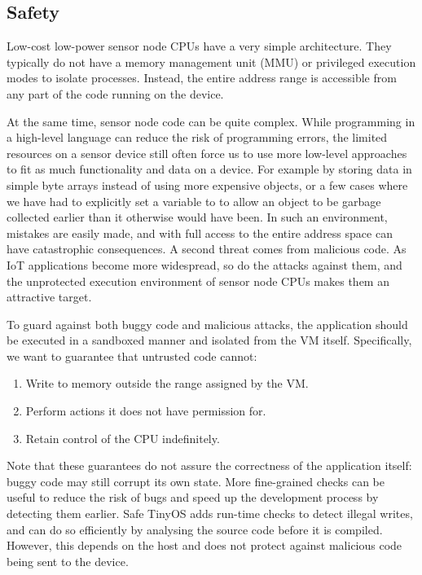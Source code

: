\subsection{Safety}
\label{sec-introduction-safety}
Low-cost low-power sensor node CPUs have a very simple architecture. They typically do not have a memory management unit (MMU) or privileged execution modes to isolate processes. Instead, the entire address range is accessible from any part of the code running on the device.

At the same time, sensor node code can be quite complex. While programming in a high-level language can reduce the risk of programming errors, the limited resources on a sensor device still often force us to use more low-level approaches to fit as much functionality and data on a device. For example by storing data in simple byte arrays instead of using more expensive objects, or a few cases where we have had to explicitly set a variable to  to allow an object to be garbage collected earlier than it otherwise would have been. In such an environment, mistakes are easily made, and with full access to the entire address space can have catastrophic consequences. A second threat comes from malicious code. As IoT applications become more widespread, so do the attacks against them, and the unprotected execution environment of sensor node CPUs makes them an attractive target.

To guard against both buggy code and malicious attacks, the application should be executed in a sandboxed manner and isolated from the VM itself. Specifically, we want to guarantee that untrusted code cannot:
\begin{enumerate}
    \item Write to memory outside the range assigned by the VM.
    \item Perform actions it does not have permission for.
    \item Retain control of the CPU indefinitely.
\end{enumerate}

Note that these guarantees do not assure the correctness of the application itself: buggy code may still corrupt its own state. More fine-grained checks can be useful to reduce the risk of bugs and speed up the development process by detecting them earlier. Safe TinyOS \cite{Cooprider:2007ub} adds run-time checks to detect illegal writes, and can do so efficiently by analysing the source code before it is compiled. However, this depends on the host and does not protect against malicious code being sent to the device.

